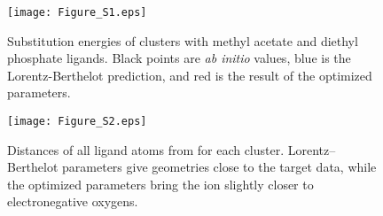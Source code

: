 \begin{figure}
    \caption[Substitution energies of \li{} from solvent to ligands]{Substitution energies of \li{} clusters with methyl acetate and diethyl phosphate ligands.
    Black points are \emph{ab initio} values, blue is the Lorentz-Berthelot prediction, and red is the result of the optimized parameters.}
    \label{figch3:energies}
    \texttt{[image: Figure\_S1.eps]}
\end{figure}

\begin{figure}
    \caption[Geometries of \li{} clusters with ligands]{Distances of all ligand atoms from \li{} for each cluster. 
    Lorentz--Berthelot parameters give geometries close to the target data, while the optimized parameters
    bring the ion slightly closer to electronegative oxygens.}
    \label{figch3:distances}
    \texttt{[image: Figure\_S2.eps]}
\end{figure}

